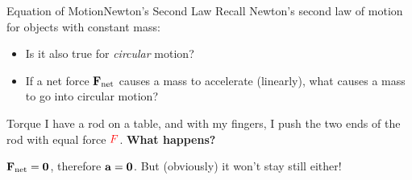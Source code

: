 \documentclass[12pt,compress,aspectratio=169]{beamer}
\newcommand{\mb}[1]{\ensuremath\mathbf{#1}}
\newcommand{\eq}[2]{\vspace{#1}{\Large\begin{displaymath}#2\end{displaymath}}}
\begin{document}
\begin{frame}{Equation of Motion}{Newton's Second Law}
  Recall Newton's second law of motion for objects with constant mass:
    
  \eq{-.2in}{
    \mb{F}_\mathrm{net}=m\mb{a}
  }
  \begin{itemize}
  \item Is it also true for \emph{circular} motion?
  \item If a net force $\mb{F}_\mathrm{net}$ causes a mass to accelerate
    (linearly), what causes a mass to go into circular motion?
  \end{itemize}

\end{frame}



\begin{frame}{Torque}
  I have a rod on a table, and with my fingers, I push the two ends of the rod
  with equal force $\textcolor{red}{F}$. \textbf{What happens?}
  \begin{center}
  \end{center}
  $\mb{F}_\mathrm{net}=\mb{0}$, therefore $\mb{a}=\mb{0}$. But (obviously) it
  won't stay still either!
\end{frame}
\end{document}
